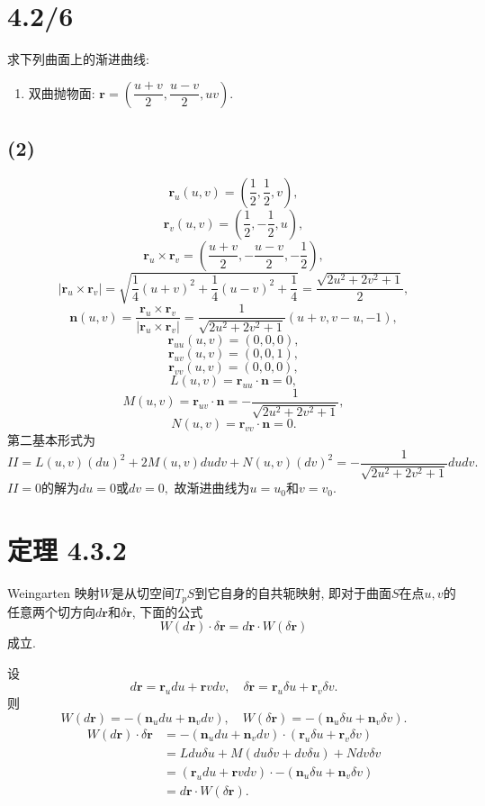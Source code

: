 \documentclass[11pt,a4paper]{article}
\author{刘逸灏 (515370910207)}
\begin{document}
\maketitle

\section{4.2/6}
\begin{problem}
求下列曲面上的渐进曲线:
\begin{enumerate}
  \addtocounter{enumi}{1}
  \item 双曲抛物面: $\mathbf{r}=\left(\dfrac{u+v}{2},\dfrac{u-v}{2},uv\right)$.
\end{enumerate}
\end{problem}

\subsection*{(2)}
$$\mathbf{r}_u(u,v)=\left(\frac{1}{2},\frac{1}{2},v\right),$$
$$\mathbf{r}_v(u,v)=\left(\frac{1}{2},-\frac{1}{2},u\right),$$
$$\mathbf{r}_u\times\mathbf{r}_v=\left(\frac{u+v}{2},-\frac{u-v}{2},-\frac{1}{2}\right),$$
$$|\mathbf{r}_u\times\mathbf{r}_v|=\sqrt{\frac{1}{4}(u+v)^2+\frac{1}{4}(u-v)^2+\frac{1}{4}}=\frac{\sqrt{2u^2+2v^2+1}}{2},$$
$$\mathbf{n}(u,v)=\frac{\mathbf{r}_u\times\mathbf{r}_v}{|\mathbf{r}_u\times\mathbf{r}_v|}=\frac{1}{\sqrt{2u^2+2v^2+1}}(u+v,v-u,-1),$$
$$\mathbf{r}_{uu}(u,v)=(0,0,0),$$
$$\mathbf{r}_{uv}(u,v)=(0,0,1),$$
$$\mathbf{r}_{vv}(u,v)=(0,0,0),$$
$$L(u,v)=\mathbf{r}_{uu}\cdot\mathbf{n}=0,$$
$$M(u,v)=\mathbf{r}_{uv}\cdot\mathbf{n}=-\frac{1}{\sqrt{2u^2+2v^2+1}},$$
$$N(u,v)=\mathbf{r}_{vv}\cdot\mathbf{n}=0.$$
第二基本形式为
$$II=L(u,v)(du)^2+2M(u,v)dudv+N(u,v)(dv)^2=-\frac{1}{\sqrt{2u^2+2v^2+1}}dudv.$$
$II=0$的解为$du=0$或$dv=0,$
故渐进曲线为$u=u_0$和$v=v_0$.

\section*{定理 4.3.2}
\begin{problem}
Weingarten 映射$W$是从切空间$T_pS$到它自身的自共轭映射, 即对于曲面$S$在点$u,v$的任意两个切方向$d\mathbf{r}$和$\delta\mathbf{r}$, 下面的公式
$$W(d\mathbf{r})\cdot\delta\mathbf{r}=d\mathbf{r}\cdot W(\delta\mathbf{r})$$
成立.
\end{problem}
设
$$d\mathbf{r}=\mathbf{r}_udu+\mathbf{r}vdv,\quad \delta\mathbf{r}=\mathbf{r}_u\delta u+\mathbf{r}_v\delta v.$$
则
$$W(d\mathbf{r})=-(\mathbf{n}_udu+\mathbf{n}_vdv),\quad W(\delta\mathbf{r})=-(\mathbf{n}_u\delta u+\mathbf{n}_v\delta v).$$
\begin{align*}
  W(d\mathbf{r})\cdot\delta\mathbf{r}
   & =-(\mathbf{n}_udu+\mathbf{n}_vdv)\cdot(\mathbf{r}_u\delta u+\mathbf{r}_v\delta v) \\
   & =Ldu\delta u+M(du\delta v+dv\delta u)+Ndv\delta v                                 \\
   & =(\mathbf{r}_udu+\mathbf{r}vdv)\cdot-(\mathbf{n}_u\delta u+\mathbf{n}_v\delta v)  \\
   & =d\mathbf{r}\cdot W(\delta\mathbf{r}).
\end{align*}
\end{document}
